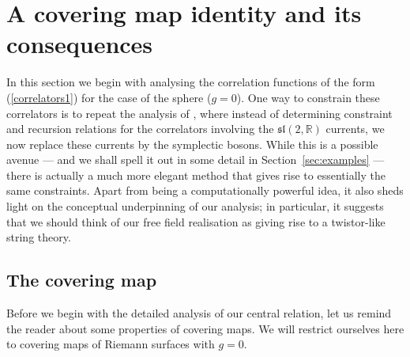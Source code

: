 \documentclass[a4paper,11pt]{article}
\numberwithin{equation}{section}
\begin{document}
\section{A covering map identity and its consequences}\label{sec:twistor}

In this section we begin with analysing the correlation functions of the form (\ref{correlators1}) for the case of the sphere ($g=0$). One way to constrain these correlators is to repeat the analysis of \cite{Eberhardt:2019ywk}, where instead of determining constraint and recursion relations for the correlators involving the $\mathfrak{sl}(2,\mathds{R})$ currents, we now replace these currents by the symplectic bosons. While this is a possible avenue --- and we shall spell it out in some detail in Section~\ref{sec:examples} --- there is actually a much more elegant method that gives rise to essentially the same constraints. Apart from being a computationally powerful idea, it also sheds light on the conceptual underpinning of our analysis; in particular, it suggests that we should think of our free field realisation as giving rise to a twistor-like string theory.

\subsection{The covering map}\label{sec:covering}

Before we begin with the detailed analysis of our central relation, let us remind the reader about some properties of covering maps. We will restrict ourselves here to covering maps of Riemann surfaces with $g=0$.
\end{document}
